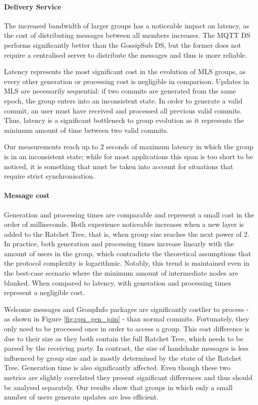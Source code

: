 \documentclass[preprint, 12pt]{elsarticle}
\begin{document}
\paragraph{\textbf{Delivery Service}}

The increased bandwidth of larger groups has a noticeable impact on latency, as the cost of distributing messages between all members increases. The MQTT DS performs significantly better than the GossipSub DS, but the former does not require a centralised server to distribute the messages and thus is more reliable. 

Latency represents the most significant cost in the evolution of MLS groups, as every other generation or processing cost is negligible in comparison. Updates in MLS are necessarily sequential: if two commits are generated from the same epoch, the group enters into an inconsistent state. In order to generate a valid commit, an user must have received and processed all previous valid commits. Thus, latency is a significant bottleneck to group evolution as it represents the minimum amount of time between two valid commits.

Our measurements reach up to 2 seconds of maximum latency in which the group is in an inconsistent state; while for most applications this span is too short to be noticed, it is something that must be taken into account for situations that require strict synchronisation.

\paragraph{\textbf{Message cost}}

Generation and processing times are comparable and represent a small cost in the order of milliseconds. Both experience noticeable increases when a new layer is added to the Ratchet Tree, that is, when group size reaches the next power of 2. In practice, both generation and processing times increase linearly with the amount of users in the group, which contradicts the theoretical assumptions that the protocol complexity is logarithmic. Notably, this trend is maintained even in the best-case scenario where the minimum amount of intermediate nodes are blanked. When compared to latency, with generation and processing times represent a negligible cost.

Welcome messages and GroupInfo packages are significantly costlier to process - as shown in Figure \ref{fig:cpu_gen_join} - than normal commits. Fortunately, they only need to be processed once in order to access a group. This cost difference is due to their size as they both contain the full Ratchet Tree, which needs to be parsed by the receiving party. In contrast, the size of handshake messages is less influenced by group size and is mostly determined by the state of the Ratchet Tree. Generation time is also significantly affected. Even though these two metrics are slightly correlated they present significant differences and thus should be analysed separately. Our results show that groups in which only a small number of users generate updates are less efficient.
\end{document}
